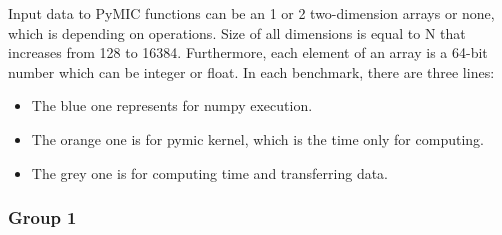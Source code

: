 Input data to PyMIC functions can be an 1 or 2 two-dimension arrays or none, which is depending on operations. Size of all dimensions is equal to N that increases from 128 to 16384. Furthermore, each element of an array is a 64-bit number which can be integer or float. In each benchmark, there are three lines:
\begin{itemize}
	\item The blue one represents for numpy execution.
	\item The orange one is for pymic kernel, which is the time only for computing.
	\item The grey one is for computing time and transferring data.
\end{itemize}

\subsubsection{Group 1}


